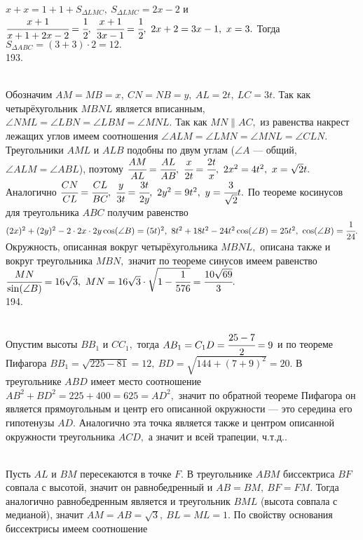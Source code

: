 $x+x=1+1+S_{\Delta LMC},\ S_{\Delta LMC}=2x-2$ и $\cfrac{x+1}{x+1+2x-2}=\cfrac{1}{2},\ \cfrac{x+1}{3x-1}=\cfrac{1}{2},\ 2x+2=3x-1,\ x=3.$ Тогда $S_{\Delta ABC}=(3+3)\cdot2=12.$\\
193. \begin{figure}[ht!]
\end{figure}\\
Обозначим $AM=MB=x,\ CN=NB=y,\ AL=2t,\ LC=3t.$ Так как четырёхугольник $MBNL$ является вписанным, $\angle NML=\angle LBN=\angle LBM=\angle MNL.$ Так как $MN\parallel AC,$ из равенства накрест лежащих углов имеем соотношения $\angle ALM=\angle LMN=\angle MNL=\angle CLN.$ Треугольники $AML$ и $ALB$ подобны по двум углам ($\angle A$ --- общий, $\angle ALM=\angle ABL$), поэтому $\cfrac{AM}{AL}=\cfrac{AL}{AB},\ \cfrac{x}{2t}=\cfrac{2t}{x},\ 2x^2=4t^2,\ x=\sqrt{2}t.$ Аналогично $\cfrac{CN}{CL}=\cfrac{CL}{BC},\ \cfrac{y}{3t}=\cfrac{3t}{2y},\ 2y^2=9t^2,\ y=\cfrac{3}{\sqrt{2}}t.$ По теореме косинусов для треугольника $ABC$ получим равенство $(2x)^2+(2y)^2-2\cdot2x\cdot2y\cos(\angle B)=(5t)^2,\
8t^2+18t^2-24t^2\cos(\angle B)=25t^2,\ \cos(\angle B)=\cfrac{1}{24}.$ Окружность, описанная вокруг четырёхугольника $MBNL,$ описана также и вокруг треугольника $MBN,$ значит по теореме синусов имеем равенство $\cfrac{MN}{\sin(\angle B)}=16\sqrt{3},\ MN=16\sqrt{3}\cdot\sqrt{1-\cfrac{1}{576}}=\cfrac{10\sqrt{69}}{3}.$\\
194. \begin{figure}[ht!]
\end{figure}\\
Опустим высоты $BB_1$ и $CC_1,$ тогда $AB_1=C_1D=\cfrac{25-7}{2}=9$ и по теореме Пифагора $BB_1=\sqrt{225-81}=12,\ BD=\sqrt{144+(7+9)^2}=20.$ В треугольнике $ABD$ имеет место соотношение $AB^2+BD^2=225+400=625=AD^2,$ значит по обратной теореме Пифагора он является прямоугольным и центр его описанной окружности --- это середина его гипотенузы $AD.$ Аналогично эта точка является также и центром описанной окружности треугольника $ACD,$ а значит и всей трапеции, ч.т.д.\newpage\noindent
195. \begin{figure}[ht!]
\end{figure}\\
Пусть $AL$ и $BM$ пересекаются в точке $F.$ В треугольнике $ABM$ биссектриса $BF$ совпала с высотой, значит он равнобедренный и $AB=BM,\ BF=FM.$ Тогда аналогично равнобедренным является и треугольник $BML$ (высота совпала с медианой), значит $AM=AB=\sqrt{3},\ BL=ML=1.$ По свойству основания биссектрисы имеем соотношение

